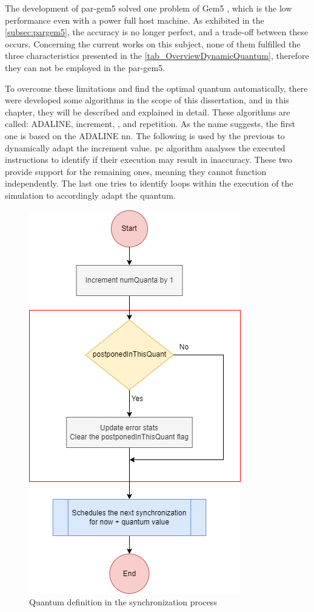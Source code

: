 
% 

The development of par-gem5 \cite{pargem5} solved one problem of Gem5 \cite{TheGem5Simulator}, which is the low performance even with a power full host machine. As exhibited in the \autoref{subsec:pargem5}, the accuracy is no longer perfect, and a trade-off between these occurs. Concerning the current works on this subject, none of them fulfilled the three characteristics presented in the \autoref{tab_OverviewDynamicQuantum}, therefore they can not be employed in the par-gem5. 

To overcome these limitations and find the optimal quantum automatically, there were developed some algorithms in the scope of this dissertation, and in this chapter, they will be described and explained in detail. These algorithms are called: ADALINE, increment, , and repetition. As the name suggests, the first one is based on the ADALINE \gls{nn}. The following is used by the previous to dynamically adapt the increment value. \gls{pc} algorithm analyses the executed instructions to identify if their execution may result in inaccuracy. These two provide support for the remaining ones, meaning they cannot function independently. The last one tries to identify loops within the execution of the simulation to accordingly adapt the quantum.  

\begin{figure}[H]
	\centering
 	\includegraphics[width=0.5\linewidth]{Images/GlobalSyncEventStatic.png}
 	\caption{Quantum definition in the synchronization process}
	 \label{fig_GlobalSyncEventStatic}
\end{figure}

